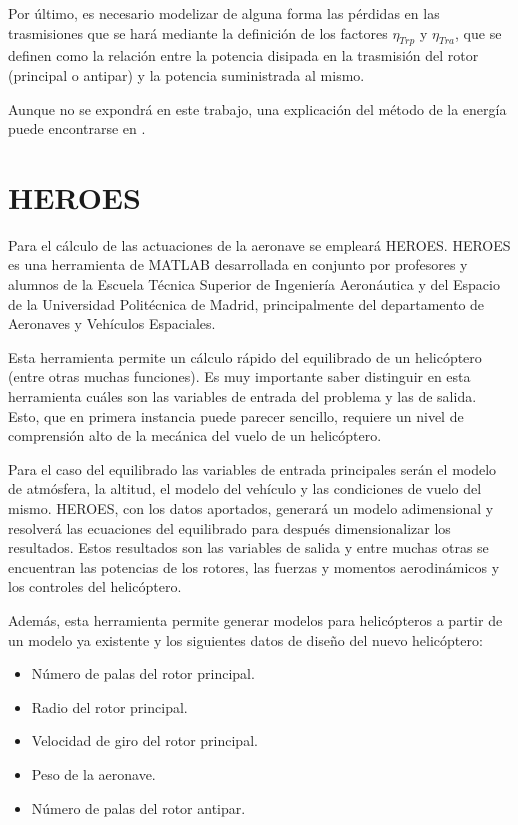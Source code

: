 Por último, es necesario modelizar de alguna forma las pérdidas en las trasmisiones que se hará mediante la definición de los factores $\eta_{Trp}$ y $\eta_{Tra}$, que se definen como la relación entre la potencia disipada en la trasmisión del rotor (principal o antipar) y la potencia suministrada al mismo.

Aunque no se expondrá en este trabajo, una explicación del método de la energía puede encontrarse en \citet{Cuerva}.

\section[\textbf{HE}licopter and \textbf{RO}tor \textbf{E}quilibrium and \textbf{S}tability toolbox]{HEROES}

Para el cálculo de las actuaciones de la aeronave se empleará HEROES.
HEROES es una herramienta de MATLAB desarrollada en conjunto por profesores y alumnos de la Escuela Técnica Superior de Ingeniería Aeronáutica y del Espacio de la Universidad Politécnica de Madrid, principalmente del departamento de Aeronaves y Vehículos Espaciales.

Esta herramienta permite un cálculo rápido del equilibrado de un helicóptero (entre otras muchas funciones). Es muy importante saber distinguir en esta herramienta cuáles son las variables de entrada del problema y las de salida. Esto, que en primera instancia puede parecer sencillo, requiere un nivel de comprensión alto de la mecánica del vuelo de un helicóptero.

Para el caso del equilibrado las variables de entrada principales serán el modelo de atmósfera, la altitud, el modelo del vehículo y las condiciones de vuelo del mismo. HEROES, con los datos aportados, generará un modelo adimensional y resolverá las ecuaciones del equilibrado para después dimensionalizar los resultados. Estos resultados son las variables de salida y entre muchas otras se encuentran las potencias de los rotores, las fuerzas y momentos aerodinámicos y los controles del helicóptero.

Además, esta herramienta permite generar modelos para helicópteros a partir de un modelo ya existente y los siguientes datos de diseño del nuevo helicóptero:

\begin{itemize}
	\item Número de palas del rotor principal.
	\item Radio del rotor principal.
	\item Velocidad de giro del rotor principal.
	\item Peso de la aeronave.
	\item Número de palas del rotor antipar.
\end{itemize}


